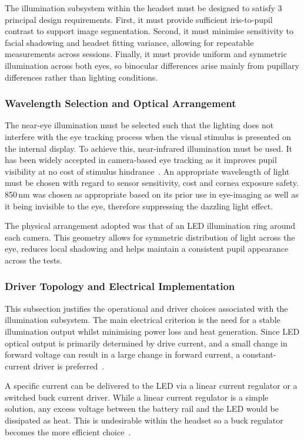 The illumination subsystem within the headset must be designed to satisfy 3 principal design requirements. First, it must provide sufficient iris-to-pupil contrast to support image segmentation. Second, it must minimise sensitivity to facial shadowing and headset fitting variance, allowing for repeatable measurements across sessions. Finally, it must provide uniform and symmetric illumination across both eyes, so binocular differences arise mainly from pupillary differences rather than lighting conditions.

\subsubsection{Wavelength Selection and Optical Arrangement}

The near-eye illumination must be selected such that the lighting does not interfere with the eye tracking process when the visual stimulus is presented on the internal display. To achieve this, near-infrared illumination must be used. It has been widely accepted in camera-based eye tracking as it improves pupil visibility at no cost of stimulus hindrance~\cite{hansen2010eye}. An appropriate wavelength of light must be chosen with regard to sensor sensitivity, cost and cornea exposure safety. 850\,nm was chosen as appropriate based on its prior use in eye-imaging as well as it being invisible to the eye, therefore suppressing the dazzling light effect.

The physical arrangement adopted was that of an LED illumination ring around each camera. This geometry allows for symmetric distribution of light across the eye, reduces local shadowing and helps maintain a consistent pupil appearance across the tests.

\subsubsection{Driver Topology and Electrical Implementation}

This subsection justifies the operational and driver choices associated with the illumination subsystem. The main electrical criterion is the need for a stable illumination output whilst minimising power loss and heat generation. Since LED optical output is primarily determined by drive current, and a small change in forward voltage can result in a large change in forward current, a constant-current driver is preferred~\cite{ti2007an1656}.

A specific current can be delivered to the LED via a linear current regulator or a switched buck current driver. While a linear current regulator is a simple solution, any excess voltage between the battery rail and the LED would be dissipated as heat. This is undesirable within the headset so a buck regulator becomes the more efficient choice~\cite{ti2007an1656}.

